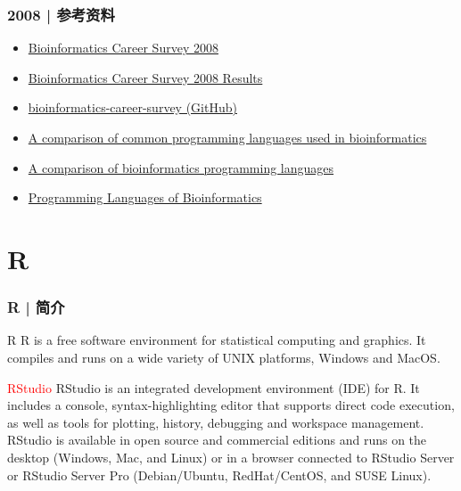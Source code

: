 \begin{frame}
  \frametitle{2008 | 参考资料}
  \begin{itemize}
    \item \href{http://openwetware.org/wiki/Biogang:Projects/Bioinformatics\_Career\_Survey\_2008}{Bioinformatics Career Survey 2008}
    \item \href{http://openwetware.org/wiki/Biogang:Projects/Bioinformatics\_Career\_Survey\_2008\_Results}{Bioinformatics Career Survey 2008 Results}
    \item \href{https://github.com/michaelbarton/bioinformatics-career-survey}{bioinformatics-career-survey (GitHub)}
    \item \href{http://www.ncbi.nlm.nih.gov/pmc/articles/PMC2267699/}{A comparison of common programming languages used in bioinformatics}
    \item \href{http://www.molecularecologist.com/2012/11/a-comparison-of-bioinformatics-programming-languages/}{A comparison of bioinformatics programming languages}
    \item \href{https://nlcb.wordpress.com/2013/02/23/programming-languages-of-bioinformatics-2/}{Programming Languages of Bioinformatics}
  \end{itemize}
\end{frame}

\section{R}
\begin{frame}
  \frametitle{R | 简介}
  \begin{block}{R}
 R is a free software environment for statistical computing and graphics. It compiles and runs on a wide variety of UNIX platforms, Windows and MacOS.
  \end{block}
  \pause
  \begin{block}{\textcolor{red}{RStudio}}
 RStudio is an integrated development environment (IDE) for R. It includes a console, syntax-highlighting editor that supports direct code execution, as well as tools for plotting, history, debugging and workspace management.\\
 \vspace{0.5em}
 RStudio is available in open source and commercial editions and runs on the desktop (Windows, Mac, and Linux) or in a browser connected to RStudio Server or RStudio Server Pro (Debian/Ubuntu, RedHat/CentOS, and SUSE Linux).
  \end{block}
\end{frame}

